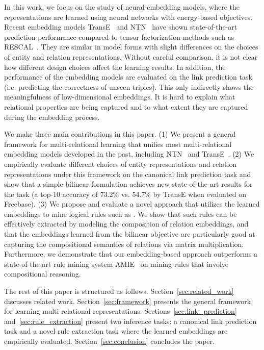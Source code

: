 \documentclass{article} \usepackage{iclr2015,times}
\begin{document}
In this work, we focus on the study of neural-embedding models, where the representations are learned using neural networks with energy-based objectives. Recent embedding models TransE~\citep{BordesUsGaWeYa2013} and NTN~\citep{SocherChenManningNg2013} have shown state-of-the-art prediction performance compared to tensor factorization methods such as RESCAL~\citep{nickel2012factorizing}. They are similar in model forms with slight differences on the choices of entity and relation representations. Without careful comparison, it is not clear how different design choices affect the learning results. In addition, the performance of the embedding models are evaluated on the link prediction task (i.e. predicting the correctness of unseen triples). This only indirectly shows the meaningfulness of low-dimensional embeddings. It is hard to explain what relational properties are being captured and to what extent they are captured during the embedding process.

We make three main contributions in this paper. (1) We present a general framework for multi-relational learning that unifies most multi-relational embedding models developed in the past, including NTN~\citep{SocherChenManningNg2013} and TransE~\citep{BordesUsGaWeYa2013}. (2) We empirically evaluate different choices of entity representations and relation representations under this framework on the canonical link prediction task and show that a simple bilinear formulation achieves new state-of-the-art results for the task (a top-10 accuracy of 73.2\% vs. 54.7\% by TransE when evaluated on Freebase). (3) We propose and evaluate a novel approach that utilizes the learned embeddings to mine logical rules such as . We show that such rules can be effectively extracted by modeling the composition of relation embeddings, and that the embeddings learned from the bilinear objective are particularly good at capturing the compositional semantics of relations via matrix multiplication. Furthermore, we demonstrate that our embedding-based approach outperforms a state-of-the-art rule mining system AMIE~\citep{galarraga2013amie} on mining rules that involve compositional reasoning.

The rest of this paper is structured as follows. Section~\ref{sec:related_work} discusses related work. Section~\ref{sec:framework} presents the general framework for learning multi-relational representations. Sections~\ref{sec:link_prediction} and~\ref{sec:rule_extraction} present two inference tasks: a canonical link prediction task and a novel rule extraction task where the learned embeddings are empirically evaluated. Section~\ref{sec:conclusion} concludes the paper.
\end{document}
